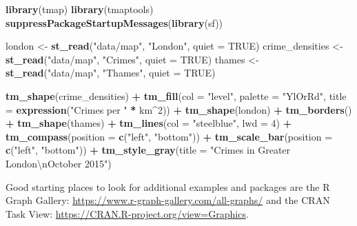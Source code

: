 \documentclass[]{book}
\newenvironment{Shaded}{\begin{snugshade}}{\end{snugshade}}
\newcommand{\CharTok}[1]{\textcolor[rgb]{0.31,0.60,0.02}{#1}}
\newcommand{\DataTypeTok}[1]{\textcolor[rgb]{0.13,0.29,0.53}{#1}}
\newcommand{\DecValTok}[1]{\textcolor[rgb]{0.00,0.00,0.81}{#1}}
\newcommand{\KeywordTok}[1]{\textcolor[rgb]{0.13,0.29,0.53}{\textbf{#1}}}
\newcommand{\NormalTok}[1]{#1}
\newcommand{\OperatorTok}[1]{\textcolor[rgb]{0.81,0.36,0.00}{\textbf{#1}}}
\newcommand{\OtherTok}[1]{\textcolor[rgb]{0.56,0.35,0.01}{#1}}
\newcommand{\StringTok}[1]{\textcolor[rgb]{0.31,0.60,0.02}{#1}}
\begin{document}
\begin{Shaded}
\begin{Highlighting}[]
\KeywordTok{library}\NormalTok{(tmap)}
\KeywordTok{library}\NormalTok{(tmaptools)}
\KeywordTok{suppressPackageStartupMessages}\NormalTok{(}\KeywordTok{library}\NormalTok{(sf))}
              
\NormalTok{london <-}\StringTok{ }\KeywordTok{st_read}\NormalTok{(}\StringTok{"data/map"}\NormalTok{, }\StringTok{"London"}\NormalTok{, }\DataTypeTok{quiet =} \OtherTok{TRUE}\NormalTok{)}
\NormalTok{crime_densities <-}\StringTok{ }\KeywordTok{st_read}\NormalTok{(}\StringTok{"data/map"}\NormalTok{, }\StringTok{"Crimes"}\NormalTok{, }\DataTypeTok{quiet =} \OtherTok{TRUE}\NormalTok{)}
\NormalTok{thames <-}\StringTok{ }\KeywordTok{st_read}\NormalTok{(}\StringTok{"data/map"}\NormalTok{, }\StringTok{"Thames"}\NormalTok{, }\DataTypeTok{quiet =} \OtherTok{TRUE}\NormalTok{)}

\KeywordTok{tm_shape}\NormalTok{(crime_densities) }\OperatorTok{+}
\StringTok{  }\KeywordTok{tm_fill}\NormalTok{(}\DataTypeTok{col =} \StringTok{"level"}\NormalTok{, }\DataTypeTok{palette =} \StringTok{"YlOrRd"}\NormalTok{, }
    \DataTypeTok{title =} \KeywordTok{expression}\NormalTok{(}\StringTok{"Crimes per "} \OperatorTok{*}\StringTok{ }\NormalTok{km}\OperatorTok{^}\DecValTok{2}\NormalTok{)) }\OperatorTok{+}\StringTok{ }
\KeywordTok{tm_shape}\NormalTok{(london) }\OperatorTok{+}\StringTok{ }\KeywordTok{tm_borders}\NormalTok{() }\OperatorTok{+}
\KeywordTok{tm_shape}\NormalTok{(thames) }\OperatorTok{+}\StringTok{ }\KeywordTok{tm_lines}\NormalTok{(}\DataTypeTok{col =} \StringTok{"steelblue"}\NormalTok{, }\DataTypeTok{lwd =} \DecValTok{4}\NormalTok{) }\OperatorTok{+}
\KeywordTok{tm_compass}\NormalTok{(}\DataTypeTok{position =} \KeywordTok{c}\NormalTok{(}\StringTok{"left"}\NormalTok{, }\StringTok{"bottom"}\NormalTok{)) }\OperatorTok{+}
\KeywordTok{tm_scale_bar}\NormalTok{(}\DataTypeTok{position =} \KeywordTok{c}\NormalTok{(}\StringTok{"left"}\NormalTok{, }\StringTok{"bottom"}\NormalTok{)) }\OperatorTok{+}\StringTok{ }
\KeywordTok{tm_style_gray}\NormalTok{(}\DataTypeTok{title =} \StringTok{"Crimes in Greater London}\CharTok{\textbackslash{}n}\StringTok{October 2015"}\NormalTok{)}
\end{Highlighting}
\end{Shaded}

Good starting places to look for additional examples and packages are the R Graph Gallery: \url{https://www.r-graph-gallery.com/all-graphs/} and the CRAN Task View: \url{https://CRAN.R-project.org/view=Graphics}.


\end{document}
